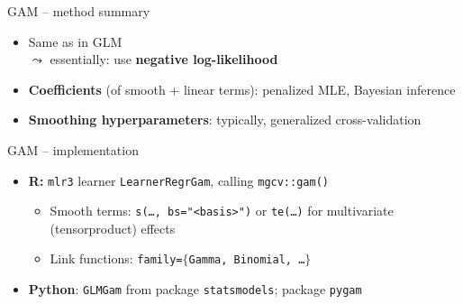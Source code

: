\begin{frame2}{GAM -- method summary}

\begin{itemize}
    \item Same as in GLM \\$\leadsto$ essentially:
use \textbf{negative log-likelihood}
\end{itemize}

\begin{itemize}
  \item \textbf{Coefficients} (of smooth + linear terms):
  penalized MLE, Bayesian inference
  \item \textbf{Smoothing hyperparameters}: typically, generalized
  cross-validation
\end{itemize}

\end{frame2}


\begin{frame2}{GAM -- implementation}


\begin{itemize}
  \item \textbf{R:} \texttt{mlr3} learner \texttt{LearnerRegrGam},
    calling \texttt{mgcv::gam()}
  \begin{itemize}
      \item Smooth terms: \texttt{s(\dots, bs="<basis>")} or \texttt{te(\dots)}
      for multivariate (tensorproduct) effects
      \item Link functions: \texttt{family=$\{$Gamma, Binomial, \dots $\}$}
  \end{itemize}
    \item \textbf{Python}: \texttt{GLMGam} from package \texttt{statsmodels};
    package \texttt{pygam}
\end{itemize}

\end{frame2}

